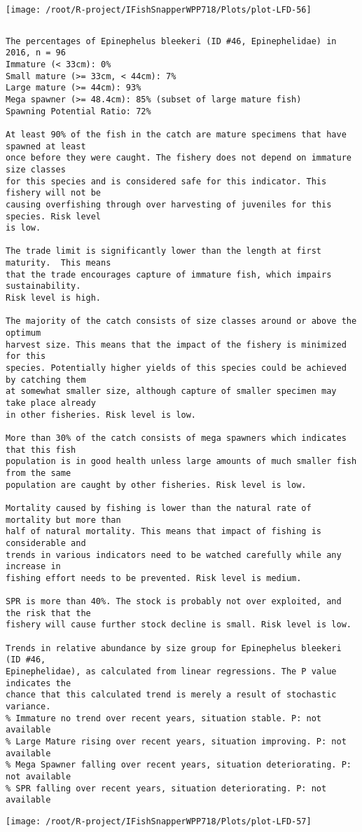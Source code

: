 \documentclass{report}\usepackage[]{graphicx}\usepackage[]{color}
\makeatletter
\def\maxwidth{ %
  \ifdim\Gin@nat@width>\linewidth
    \linewidth
  \else
    \Gin@nat@width
  \fi
}
\newenvironment{kframe}{%
 \def\at@end@of@kframe{}%
 \ifinner\ifhmode%
  \def\at@end@of@kframe{\end{minipage}}%
  \begin{minipage}{\columnwidth}%
 \fi\fi%
 \def\FrameCommand##1{\hskip\@totalleftmargin \hskip-\fboxsep
 \colorbox{shadecolor}{##1}\hskip-\fboxsep
     \hskip-\linewidth \hskip-\@totalleftmargin \hskip\columnwidth}%
 \MakeFramed {\advance\hsize-\width
   \@totalleftmargin\z@ \linewidth\hsize
   \@setminipage}}%
 {\par\unskip\endMakeFramed%
 \at@end@of@kframe}
\newenvironment{knitrout}{}{} %
\makeatother
\begin{document}
\begin{knitrout}
\texttt{[image: /root/R-project/IFishSnapperWPP718/Plots/plot-LFD-56]} 
\begin{kframe}\begin{verbatim}
\end{verbatim}
\end{kframe}
\clearpage
\newpage
\begin{kframe}\begin{verbatim}The percentages of Epinephelus bleekeri (ID #46, Epinephelidae) in 2016, n = 96
Immature (< 33cm): 0%
Small mature (>= 33cm, < 44cm): 7%
Large mature (>= 44cm): 93%
Mega spawner (>= 48.4cm): 85% (subset of large mature fish)
Spawning Potential Ratio: 72%
 
At least 90% of the fish in the catch are mature specimens that have spawned at least
once before they were caught. The fishery does not depend on immature size classes
for this species and is considered safe for this indicator. This fishery will not be
causing overfishing through over harvesting of juveniles for this species. Risk level
is low.

The trade limit is significantly lower than the length at first maturity.  This means
that the trade encourages capture of immature fish, which impairs sustainability.
Risk level is high.

The majority of the catch consists of size classes around or above the optimum
harvest size. This means that the impact of the fishery is minimized for this
species. Potentially higher yields of this species could be achieved by catching them
at somewhat smaller size, although capture of smaller specimen may take place already
in other fisheries. Risk level is low.

More than 30% of the catch consists of mega spawners which indicates that this fish
population is in good health unless large amounts of much smaller fish from the same
population are caught by other fisheries. Risk level is low.
 
Mortality caused by fishing is lower than the natural rate of mortality but more than
half of natural mortality. This means that impact of fishing is considerable and
trends in various indicators need to be watched carefully while any increase in
fishing effort needs to be prevented. Risk level is medium.
 
SPR is more than 40%. The stock is probably not over exploited, and the risk that the
fishery will cause further stock decline is small. Risk level is low.
 
Trends in relative abundance by size group for Epinephelus bleekeri (ID #46,
Epinephelidae), as calculated from linear regressions. The P value indicates the
chance that this calculated trend is merely a result of stochastic variance.
% Immature no trend over recent years, situation stable. P: not available
% Large Mature rising over recent years, situation improving. P: not available
% Mega Spawner falling over recent years, situation deteriorating. P: not available
% SPR falling over recent years, situation deteriorating. P: not available
\end{verbatim}
\end{kframe}
\texttt{[image: /root/R-project/IFishSnapperWPP718/Plots/plot-LFD-57]} 


\end{knitrout}
\end{document}
